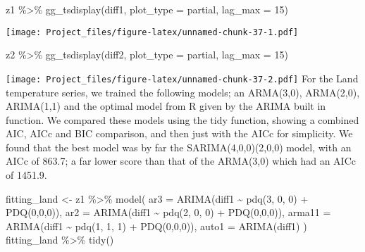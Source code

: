 \documentclass[
]{article}
\newenvironment{Shaded}{\begin{snugshade}}{\end{snugshade}}
\newcommand{\AttributeTok}[1]{\textcolor[rgb]{0.77,0.63,0.00}{#1}}
\newcommand{\DecValTok}[1]{\textcolor[rgb]{0.00,0.00,0.81}{#1}}
\newcommand{\FunctionTok}[1]{\textcolor[rgb]{0.00,0.00,0.00}{#1}}
\newcommand{\NormalTok}[1]{#1}
\newcommand{\OtherTok}[1]{\textcolor[rgb]{0.56,0.35,0.01}{#1}}
\newcommand{\SpecialCharTok}[1]{\textcolor[rgb]{0.00,0.00,0.00}{#1}}
\newcommand{\StringTok}[1]{\textcolor[rgb]{0.31,0.60,0.02}{#1}}
\begin{document}
\begin{Shaded}
\begin{Highlighting}[]
\NormalTok{z1 }\SpecialCharTok{\%\textgreater{}\%} \FunctionTok{gg\_tsdisplay}\NormalTok{(diff1, }\AttributeTok{plot\_type =} \StringTok{\textquotesingle{}partial\textquotesingle{}}\NormalTok{, }\AttributeTok{lag\_max =} \DecValTok{15}\NormalTok{)}
\end{Highlighting}
\end{Shaded}

\texttt{[image: Project\_files/figure-latex/unnamed-chunk-37-1.pdf]}

\begin{Shaded}
\begin{Highlighting}[]
\NormalTok{z2 }\SpecialCharTok{\%\textgreater{}\%} \FunctionTok{gg\_tsdisplay}\NormalTok{(diff2, }\AttributeTok{plot\_type =} \StringTok{\textquotesingle{}partial\textquotesingle{}}\NormalTok{, }\AttributeTok{lag\_max =} \DecValTok{15}\NormalTok{)}
\end{Highlighting}
\end{Shaded}

\texttt{[image: Project\_files/figure-latex/unnamed-chunk-37-2.pdf]} For
the Land temperature series, we trained the following models; an
ARMA(3,0), ARMA(2,0), ARIMA(1,1) and the optimal model from R given by
the ARIMA built in function. We compared these models using the tidy
function, showing a combined AIC, AICc and BIC comparison, and then just
with the AICc for simplicity. We found that the best model was by far
the SARIMA(4,0,0)(2,0,0) model, with an AICc of 863.7; a far lower score
than that of the ARMA(3,0) which had an AICc of 1451.9.

\begin{Shaded}
\begin{Highlighting}[]
\NormalTok{fitting\_land }\OtherTok{\textless{}{-}}\NormalTok{ z1 }\SpecialCharTok{\%\textgreater{}\%}
  \FunctionTok{model}\NormalTok{(}
        \AttributeTok{ar3 =} \FunctionTok{ARIMA}\NormalTok{(diff1 }\SpecialCharTok{\textasciitilde{}} \FunctionTok{pdq}\NormalTok{(}\DecValTok{3}\NormalTok{, }\DecValTok{0}\NormalTok{, }\DecValTok{0}\NormalTok{) }\SpecialCharTok{+} \FunctionTok{PDQ}\NormalTok{(}\DecValTok{0}\NormalTok{,}\DecValTok{0}\NormalTok{,}\DecValTok{0}\NormalTok{)),}
        \AttributeTok{ar2 =} \FunctionTok{ARIMA}\NormalTok{(diff1 }\SpecialCharTok{\textasciitilde{}} \FunctionTok{pdq}\NormalTok{(}\DecValTok{2}\NormalTok{, }\DecValTok{0}\NormalTok{, }\DecValTok{0}\NormalTok{) }\SpecialCharTok{+} \FunctionTok{PDQ}\NormalTok{(}\DecValTok{0}\NormalTok{,}\DecValTok{0}\NormalTok{,}\DecValTok{0}\NormalTok{)), }
        \AttributeTok{arma11 =} \FunctionTok{ARIMA}\NormalTok{(diff1 }\SpecialCharTok{\textasciitilde{}} \FunctionTok{pdq}\NormalTok{(}\DecValTok{1}\NormalTok{, }\DecValTok{1}\NormalTok{, }\DecValTok{1}\NormalTok{) }\SpecialCharTok{+} \FunctionTok{PDQ}\NormalTok{(}\DecValTok{0}\NormalTok{,}\DecValTok{0}\NormalTok{,}\DecValTok{0}\NormalTok{)), }
        \AttributeTok{auto1 =} \FunctionTok{ARIMA}\NormalTok{(diff1)}
\NormalTok{        )}
\NormalTok{fitting\_land }\SpecialCharTok{\%\textgreater{}\%} \FunctionTok{tidy}\NormalTok{()}
\end{Highlighting}
\end{Shaded}
\end{document}
